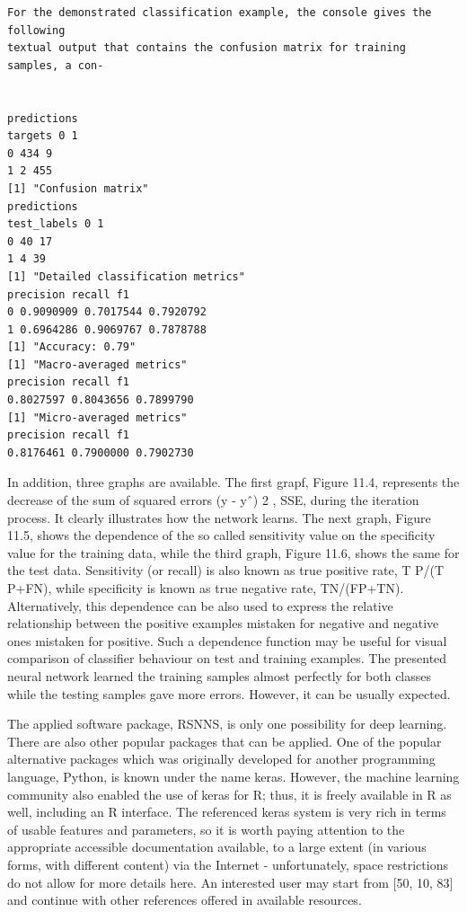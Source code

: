 \documentclass[11pt,openany,executivepaper]{book}
\begin{document}
\begin{verbatim}
For the demonstrated classification example, the console gives the following
textual output that contains the confusion matrix for training samples, a con-


predictions
targets 0 1
0 434 9
1 2 455
[1] "Confusion matrix"
predictions
test_labels 0 1
0 40 17
1 4 39
[1] "Detailed classification metrics"
precision recall f1
0 0.9090909 0.7017544 0.7920792
1 0.6964286 0.9069767 0.7878788
[1] "Accuracy: 0.79"
[1] "Macro-averaged metrics"
precision recall f1
0.8027597 0.8043656 0.7899790
[1] "Micro-averaged metrics"
precision recall f1
0.8176461 0.7900000 0.7902730
\end{verbatim}

In addition, three graphs are available. The first grapf, Figure 11.4, represents
the decrease of the sum of squared errors (y - yˆ)
2
, SSE, during the iteration
process. It clearly illustrates how the network learns.
The next graph, Figure 11.5, shows the dependence of the so called sensitivity value on the specificity value for the training data, while the third graph,
Figure 11.6, shows the same for the test data. Sensitivity (or recall) is also known
as true positive rate, T P/(T P+FN), while specificity is known as true negative
rate, TN/(FP+TN).
Alternatively, this dependence can be also used to express the relative relationship between the positive examples mistaken for negative and negative ones
mistaken for positive. Such a dependence function may be useful for visual comparison of classifier behaviour on test and training examples. The presented neural network learned the training samples almost perfectly for both classes while
the testing samples gave more errors. However, it can be usually expected.

The applied software package, RSNNS, is only one possibility for deep learning. There are also other popular packages that can be applied. One of the popular
alternative packages which was originally developed for another programming
language, Python, is known under the name keras. However, the machine learning community also enabled the use of keras for R; thus, it is freely available in
R as well, including an R interface.
The referenced keras system is very rich in terms of usable features and parameters, so it is worth paying attention to the appropriate accessible documentation available, to a large extent (in various forms, with different content) via
the Internet - unfortunately, space restrictions do not allow for more details here.
An interested user may start from [50, 10, 83] and continue with other references
offered in available resources.
\end{document}
